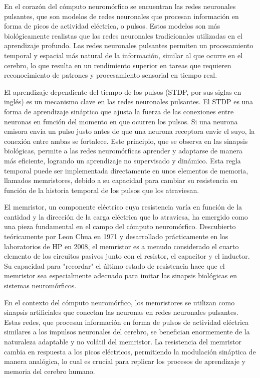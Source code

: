 \documentclass[conference]{IEEEtran}
\begin{document}
En el corazón del cómputo neuromórfico se encuentran las redes neuronales pulsantes, que son modelos de redes neuronales que procesan información en forma de picos de actividad eléctrica, o pulsos. Estos modelos son más biológicamente realistas que las redes neuronales tradicionales utilizadas en el aprendizaje profundo. Las redes neuronales pulsantes permiten un procesamiento temporal y espacial más natural de la información, similar al que ocurre en el cerebro, lo que resulta en un rendimiento superior en tareas que requieren reconocimiento de patrones y procesamiento sensorial en tiempo real.

El aprendizaje dependiente del tiempo de los pulsos (STDP, por sus siglas en inglés) es un mecanismo clave en las redes neuronales pulsantes. El STDP es una forma de aprendizaje sináptico que ajusta la fuerza de las conexiones entre neuronas en función del momento en que ocurren los pulsos. Si una neurona emisora envía un pulso justo antes de que una neurona receptora envíe el suyo, la conexión entre ambas se fortalece. Este principio, que se observa en las sinapsis biológicas, permite a las redes neuromórficas aprender y adaptarse de manera más eficiente, logrando un aprendizaje no supervisado y dinámico. Esta regla temporal puede ser implementada directamente en unos elementos de memoria, llamados memristores, debido a su capacidad para cambiar su resistencia en función de la historia temporal de los pulsos que los atraviesan.

El memristor, un componente eléctrico cuya resistencia varía en función de la cantidad y la dirección de la carga eléctrica que lo atraviesa, ha emergido como una pieza fundamental en el campo del cómputo neuromórfico. Descubierto teóricamente por Leon Chua en 1971 y desarrollado prácticamente en los laboratorios de HP en 2008, el memristor es a menudo considerado el cuarto elemento de los circuitos pasivos junto con el resistor, el capacitor y el inductor. Su capacidad para "recordar" el último estado de resistencia hace que el memristor sea especialmente adecuado para imitar las sinapsis biológicas en sistemas neuromórficos.

En el contexto del cómputo neuromórfico, los memristores se utilizan como sinapsis artificiales que conectan las neuronas en redes neuronales pulsantes. Estas redes, que procesan información en forma de pulsos de actividad eléctrica similares a los impulsos neuronales del cerebro, se benefician enormemente de la naturaleza adaptable y no volátil del memristor. La resistencia del memristor cambia en respuesta a los picos eléctricos, permitiendo la modulación sináptica de manera analógica, lo cual es crucial para replicar los procesos de aprendizaje y memoria del cerebro humano.
\end{document}
